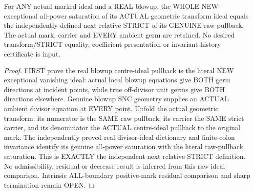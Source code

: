 \begin{theorem}
\label{hir:sharp-actual-geometric-transform-full-relative-saturation-dictionary}
\leanok
For ANY actual marked ideal and a REAL blowup, the WHOLE NEW-exceptional
all-power saturation of its ACTUAL geometric transform ideal equals the
independently defined next relative STRICT of its GENUINE raw pullback.
The actual mark, carrier and EVERY ambient germ are retained. No desired
transform/STRICT equality, coefficient presentation or invariant-history
certificate is input.
\end{theorem}
\begin{proof}
FIRST prove the real blowup centre-ideal pullback is the literal NEW
exceptional vanishing ideal: actual local blowup equations give BOTH germ
directions at incident points, while true off-divisor unit germs give BOTH
directions elsewhere. Genuine blowup SNC geometry supplies an ACTUAL
ambient divisor equation at EVERY point. Unfold the actual geometric
transform: its numerator is the SAME raw pullback, its carrier the SAME
strict carrier, and its denominator the ACTUAL centre-ideal pullback to
the original mark. The independently proved real divisor-ideal dictionary
and finite-colon invariance identify its genuine all-power saturation with
the literal raw-pullback saturation. This is EXACTLY the independent next
relative STRICT definition. No admissibility, residual or decrease result
is inferred from this raw ideal comparison. Intrinsic ALL-boundary
positive-mark residual comparison and sharp termination remain OPEN.
\end{proof}
